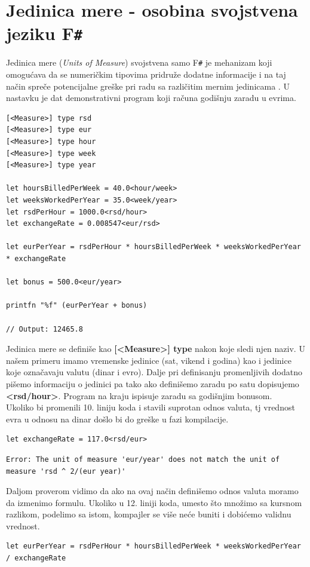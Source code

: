 \documentclass[a4paper]{article}
\begin{document}
\section{Jedinica mere - osobina svojstvena jeziku F\texttt{\#}}
Jedinica mere (\textit{Units of Measure}) svojstvena samo F\texttt{\#} je mehanizam koji omogućava da se numeričkim tipovima pridruže dodatne informacije i na taj način spreče potencijalne greške pri radu sa različitim mernim jedinicama \cite{unitsOfMeasure}. U nastavku je dat demonstrativni program koji računa godišnju zaradu u evrima.
\begin{lstlisting}[caption={Primer jedinice mere\cite{unitsOfMeasureExample}},frame=single, label=primer]
[<Measure>] type rsd
[<Measure>] type eur
[<Measure>] type hour
[<Measure>] type week
[<Measure>] type year

let hoursBilledPerWeek = 40.0<hour/week>
let weeksWorkedPerYear = 35.0<week/year>
let rsdPerHour = 1000.0<rsd/hour>
let exchangeRate = 0.008547<eur/rsd>

let eurPerYear = rsdPerHour * hoursBilledPerWeek * weeksWorkedPerYear * exchangeRate

let bonus = 500.0<eur/year>

printfn "%f" (eurPerYear + bonus)

// Output: 12465.8

\end{lstlisting}
Jedinica mere se definiše kao \textbf{[<Measure>] type} nakon koje sledi njen naziv. U našem primeru imamo vremenske jedinice (sat, vikend i godina) kao i jedinice koje označavaju valutu (dinar i evro). Dalje pri definisanju promenljivih dodatno pišemo informaciju o jedinici pa tako ako definišemo zaradu po satu dopisujemo \textbf{<rsd/hour>}. Program na kraju ispisuje zaradu sa godišnjim bonusom. \\
Ukoliko bi promenili 10. liniju koda i stavili suprotan odnos valuta, tj vrednost evra u odnosu na dinar došlo bi do greške u fazi kompilacije. 
\begin{lstlisting}[caption={Promenjen odnos valuta},frame=single, label=primer, firstnumber=9]
let exchangeRate = 117.0<rsd/eur>
\end{lstlisting}
\begin{lstlisting}[caption={Kompajler prepoznaje grešku},frame=single, label=primer]
Error: The unit of measure 'eur/year' does not match the unit of measure 'rsd ^ 2/(eur year)'
\end{lstlisting}
Daljom proverom vidimo da ako na ovaj način definišemo odnos valuta moramo da izmenimo formulu. Ukoliko u 12. liniji koda, umesto što množimo sa kursnom razlikom, podelimo sa istom, kompajler se više neće buniti i dobićemo validnu vrednost.
\begin{lstlisting}[caption={Ispravljena linija},frame=single, label=primer, firstnumber=12]
let eurPerYear = rsdPerHour * hoursBilledPerWeek * weeksWorkedPerYear / exchangeRate
\end{lstlisting}
\end{document}
